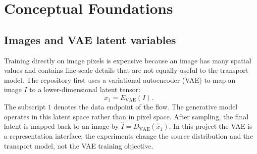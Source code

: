 \documentclass[11pt,a4paper]{article}
\newcommand{\fid}{\mathrm{FID}}
\newcommand{\metric}[1]{\texttt{\small\detokenize{#1}}}
\begin{document}
\begin{abstract}
This report analyzes experiments on Gaussian-mixture source modeling and
learned routing for Flow Matching. The implementation is labeled GMM--TIDE in
the repository and run records, but this Project II study uses only the Flow
Matching training path rather than the full shortcut objective. The experiments
were completed through 23 July 2026, and the evidence is organized by algorithm
rather than execution date. The
historical reference uses K16, top-2, soft 0.75, and Dirichlet-512 with a single
\(\fid_{128}=6.969\) measurement. The strongest controlled evidence is a
\(2\times2\) factorial over source construction
(\metric{weighted} versus \metric{sample_topk}) and router training domain
(\metric{mix} versus \metric{bridge}), evaluated at checkpoint 400k over three
GMM randomization seeds and five image-generation seeds per checkpoint.
\metric{sample_topk}+\metric{mix} has the best aggregate mean, \(7.046\), but
the descriptive sample-topk effect has a 95\% \(t\)-interval that crosses zero.
Bridge is unstable across GMM seeds. Within-checkpoint evaluation noise
(sample SD \(0.019\)--\(0.043\)) is much smaller than variation caused by
refitting the GMM/source. Router distillation accuracy, flow curvature,
balanced component usage, and source scale are useful failure diagnostics but
none is a reliable surrogate for FID. No method in this study has yet
established a matched, repeated improvement over the historical reference.
\end{abstract}

\tableofcontents
\newpage

\section{Conceptual Foundations}

\subsection{Images and VAE latent variables}

Training directly on image pixels is expensive because an image has many
spatial values and contains fine-scale details that are not equally useful to
the transport model. The repository first uses a variational autoencoder
(VAE) \cite{kingma2014vae} to map an image \(I\) to a lower-dimensional
latent tensor:
\[
 x_1=E_{\mathrm{VAE}}(I).
\]
The subscript \(1\) denotes the data endpoint of the flow. The generative model
operates in this latent space rather than in pixel space. After sampling, the
final latent is mapped back to an image by
\(\widehat I=D_{\mathrm{VAE}}(\widehat x_1)\). In this project the VAE is a
representation interface; the experiments change the source distribution and
the transport model, not the VAE training objective.
\end{document}
